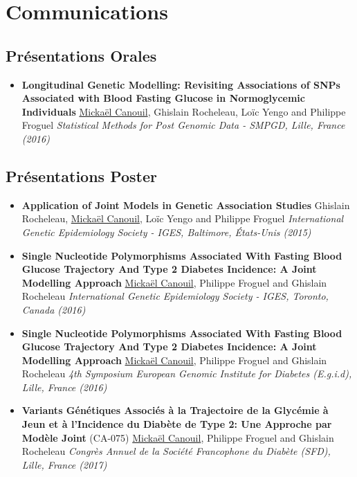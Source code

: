 \documentclass[11pt,a4paper,sans]{moderncv}
\begin{document}
\clearpage
\section{Communications}
\subsection{Présentations Orales}
\begin{itemize}
    \setlength{\itemsep}{0.5em}
    \item \textbf{Longitudinal Genetic Modelling: Revisiting Associations of SNPs Associated with Blood Fasting Glucose in Normoglycemic Individuals}
        \newline \underline{Mickaël Canouil}, Ghislain Rocheleau, Loïc Yengo and Philippe Froguel
        \newline \textit{Statistical Methods for Post Genomic Data - SMPGD, Lille, France (2016)}
\end{itemize}

\subsection{Présentations Poster}
\begin{itemize}
    \setlength{\itemsep}{0.5em}
    \item \textbf{Application of Joint Models in Genetic Association Studies}
        \newline Ghislain Rocheleau, \underline{Mickaël Canouil}, Loïc Yengo and Philippe Froguel
        \newline \textit{International Genetic Epidemiology Society - IGES, Baltimore, États-Unis (2015)}
    \item \textbf{Single Nucleotide Polymorphisms Associated With Fasting Blood Glucose Trajectory And Type 2 Diabetes Incidence: A Joint Modelling Approach}
        \newline \underline{Mickaël Canouil}, Philippe Froguel and Ghislain Rocheleau
        \newline \textit{International Genetic Epidemiology Society - IGES, Toronto, Canada (2016)}
    \item \textbf{Single Nucleotide Polymorphisms Associated With Fasting Blood Glucose Trajectory And Type 2 Diabetes Incidence: A Joint Modelling Approach}
        \newline \underline{Mickaël Canouil}, Philippe Froguel and Ghislain Rocheleau
        \newline \textit{4th Symposium European Genomic Institute for Diabetes (E.g.i.d), Lille, France (2016)}
    \item \textbf{Variants Génétiques Associés à la Trajectoire de la Glycémie à Jeun et à l’Incidence du Diabète de Type 2: Une Approche par Modèle Joint} (CA-075)
        \newline \underline{Mickaël Canouil}, Philippe Froguel and Ghislain Rocheleau
        \newline \textit{Congrès Annuel de la Société Francophone du Diabète (SFD), Lille, France (2017)}
\end{itemize}



\end{document}
